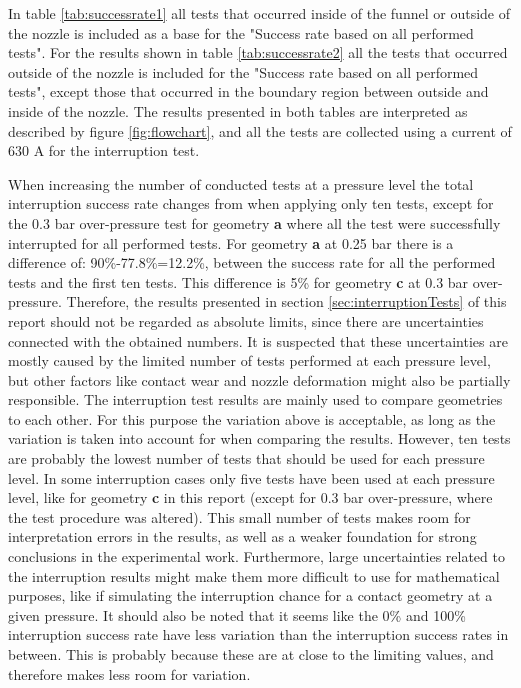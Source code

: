 \documentclass[10pt,b5paper,twoside]{article}
\begin{document}
In table \ref{tab:successrate1} all tests that occurred inside of the funnel or outside of the nozzle is included as a base for the "Success rate based on all performed tests". For the results shown in table \ref{tab:successrate2} all the tests that occurred outside of the nozzle is included for the "Success rate based on all performed tests", except those that occurred in the boundary region between outside and inside of the nozzle. The results presented in both tables are interpreted as described by figure \ref{fig:flowchart}, and all the tests are collected using a current of 630 A for the interruption test. 

When increasing the number of conducted tests at a pressure level the total interruption success rate changes from when applying only ten tests, except for the 0.3 bar over-pressure test for geometry \textbf{a} where all the test were successfully interrupted for all performed tests. For geometry \textbf{a} at 0.25 bar there is a difference of: 90\%-77.8\%=12.2\%, between the success rate for all the performed tests and the first ten tests. This difference is 5\% for geometry \textbf{c} at 0.3 bar over-pressure. Therefore, the results presented in section \ref{sec:interruptionTests} of this report should not be regarded as absolute limits, since there are uncertainties connected with the obtained numbers. It is suspected that these uncertainties are mostly caused by the limited number of tests performed at each pressure level, but other factors like contact wear and nozzle deformation might also be partially responsible. The interruption test results are mainly used to compare geometries to each other. For this purpose the variation above is acceptable, as long as the variation is taken into account for when comparing the results. However, ten tests are probably the lowest number of tests that should be used for each pressure level. In some interruption cases only five tests have been used at each pressure level, like for geometry \textbf{c} in this report (except for 0.3 bar over-pressure, where the test procedure was altered). This small number of tests makes room for interpretation errors in the results, as well as a weaker foundation for strong conclusions in the experimental work. Furthermore, large uncertainties related to the interruption results might make them more difficult to use for mathematical purposes, like if simulating the interruption chance for a contact geometry at a given pressure. It should also be noted that it seems like the 0\% and 100\% interruption success rate have less variation than the interruption success rates in between. This is probably because these are at close to the limiting values, and therefore makes less room for variation.
\end{document}
